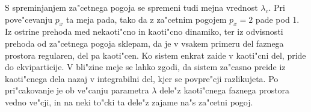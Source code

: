 \documentclass[a4paper,10pt]{article}
\begin{document}
S spreminjanjem za"cetnega pogoja se spremeni tudi mejna vrednost $\lambda_c$. Pri pove"cevanju $p_x$ ta meja pada, tako da z za"cetnim pogojem $p_x=2$ pade pod 1. Iz ostrine prehoda med nekaoti"cno in kaoti"cno dinamiko, ter iz odvisnosti prehoda od za"cetnega pogoja sklepam, da je v vsakem primeru del faznega prostora regularen, del pa kaoti"cen. Ko sistem enkrat zaide v kaoti"cni del, pride do ekviparticije. V bli"zine meje se lahko zgodi, da sistem za"casno preide iz kaoti"cnega dela nazaj v integrabilni del, kjer se povpre"cji razlikujeta. Po pri"cakovanje je ob ve"canju parametra $\lambda$ dele"z kaoti"cnega faznega prostora vedno ve"cji, in na neki to"cki ta dele"z zajame na"s za"cetni pogoj.  
\end{document}
